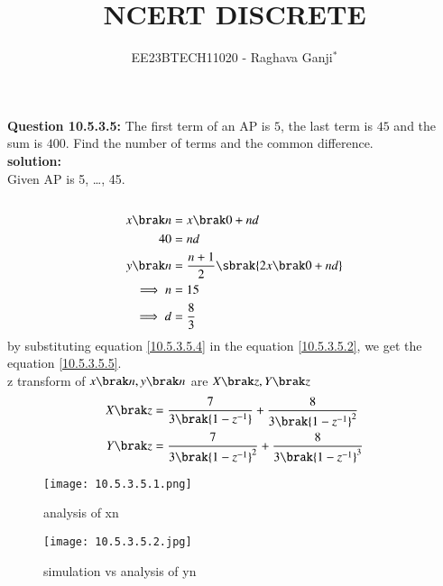 \documentclass[journal,12pt,twocolumn]{IEEEtran}
\theoremstyle{remark}
\begin{document}

\vspace{3cm}

\title{NCERT DISCRETE}
\author{EE23BTECH11020 - Raghava Ganji$^{*}$%
}
\maketitle
\newpage
\bigskip

\renewcommand{\thefigure}{\theenumi}
\renewcommand{\thetable}{\theenumi}

\textbf{Question 10.5.3.5:}
The first term of an AP is $5$, the last term is $45$ and the sum is $400$. Find the number of terms and the common difference.\\
\textbf{solution:}\\
Given AP is 5, \ldots, 45.\\\\

\begin{align}
x\brak n&=x\brak 0+nd\\
40&=nd\label{10.5.3.5.2}\\
y\brak n&=\frac{n+1}{2} \sbrak {2x\brak 0+nd}\\
\implies n&=15\label{10.5.3.5.4}\\
\implies d&=\frac{8}{3}\label{10.5.3.5.5}
\end{align}
by substituting equation \eqref{10.5.3.5.4} in the  equation \eqref{10.5.3.5.2}, we get the equation \eqref{10.5.3.5.5}.\\
z transform of $x\brak n,y\brak n$ are $X\brak z,Y\brak z$
\begin{align}
X\brak z&=\frac{7}{3\brak{1-z^{-1}}}+\frac{8}{3\brak{1-z^{-1}}^2}\\
Y\brak z&=\frac{7}{3\brak{1-z^{-1}}^2}+\frac{8}{3\brak{1-z^{-1}}^3}
\end{align}
\begin{figure}
    \centering
    \texttt{[image: 10.5.3.5.1.png]}
    \caption{analysis of x\brak n}
\end{figure}
\begin{figure}
    \centering
    \texttt{[image: 10.5.3.5.2.jpg]}
    \caption{simulation vs analysis of y\brak n}
\end{figure}
\end{document}
